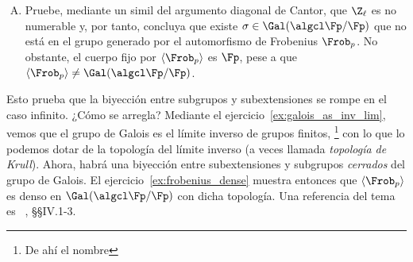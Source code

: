 \documentclass[11pt, reqno]{amsart}
\begin{document}
\begin{additional}
\begin{enumerate}[A., ref=\Alph*]
	\item\label{ex:frobenius_dense}
		Pruebe, mediante un simil del argumento diagonal de Cantor, que $\Z_\ell$ es no numerable y, por tanto, concluya que existe
		$\sigma \in \Gal(\algcl\Fp/\Fp)$ que no está en el grupo generado por el automorfismo de Frobenius $\Frob_p$.
		No obstante, el cuerpo fijo por $\langle \Frob_p \rangle$ es $\Fp$, pese a que $\langle \Frob_p \rangle \ne
		\Gal(\algcl\Fp/\Fp)$.
\end{enumerate}
Esto prueba que la biyección entre subgrupos y subextensiones se rompe en el caso infinito.
¿Cómo se arregla?
Mediante el ejercicio~\ref{ex:galois_as_inv_lim}, vemos que el grupo de Galois es el límite inverso de grupos finitos,%
\footnote{De ahí el nombre }
con lo que lo podemos dotar de la topología del límite inverso (a veces llamada \emph{topología de Krull}).
Ahora, habrá una biyección entre subextensiones y subgrupos \emph{cerrados} del grupo de Galois.
El ejercicio~\ref{ex:frobenius_dense} muestra entonces que $\langle \Frob_p \rangle$ es denso en $\Gal(\algcl\Fp/\Fp)$ con dicha topología.
Una referencia del tema es
\citeauthor{neukirch:algebraic}~\cite{neukirch:algebraic}, \S\S IV.1-3.
\end{additional}

\nocite{lang:algebra}

\printbibliography
\end{document}
